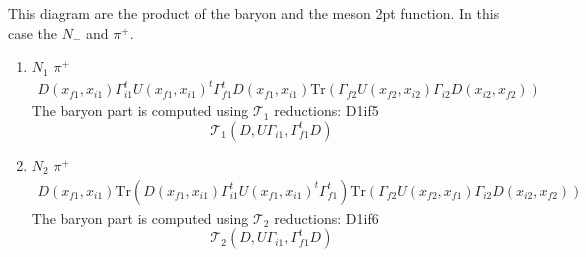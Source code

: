 \documentclass{article}[12pt]
\begin{document}
\begin{itemize}
This diagram are the product of the baryon and the meson 2pt function. In this case the $N_{-}$ and $\pi^{+}$. 
\begin{enumerate}
\item $N_1$ $\pi^+$
\begin{eqnarray}
D(x_{f1},x_{i1})\Gamma_{i1}^tU(x_{f1},x_{i1})^t\Gamma_{f1}^tD(x_{f1},x_{i1})\mathrm{Tr}(\Gamma_{f2}U(x_{f2},x_{i2})\Gamma_{i2}D(x_{i2},x_{f2}))
\end{eqnarray}
The baryon part is computed using ${\mathcal T}_1$ reductions:
D1if5
$$
{\mathcal T}_1\left(D,U\Gamma_{i1},\Gamma_{f1}^tD\right)
$$
\item $N_2$ $\pi^+$
\begin{eqnarray}
D(x_{f1},x_{i1})\mathrm{Tr}(D(x_{f1},x_{i1})\Gamma_{i1}^tU(x_{f1},x_{i1})^t\Gamma_{f1}^t)\mathrm{Tr}(\Gamma_{f2}U(x_{f2},x_{f1})\Gamma_{i2}D(x_{i2},x_{f2}))
\end{eqnarray}
The baryon part is computed using ${\mathcal T}_2$ reductions:
D1if6
$$
{\mathcal T}_2\left(D,U\Gamma_{i1},\Gamma_{f1}^tD\right)
$$
\end{enumerate}
\end{itemize}
\end{document}
